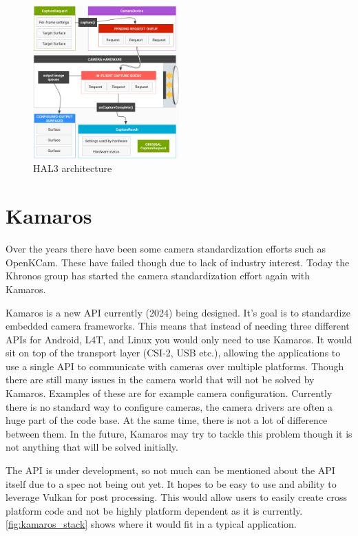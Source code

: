 \begin{figure}
    \begin{center}
        \includegraphics[width=0.5\textwidth]{figures/hal3arch}
    \end{center}
    \caption{HAL3 architecture \cite{hal3arch}}\label{fig:hal3arch}
\end{figure}

\section{Kamaros}
Over the years there have been some camera standardization efforts such as
OpenKCam. These have failed though due to lack of industry interest. Today
the Khronos group has started the camera standardization effort again with
Kamaros.

Kamaros is a new API currently (2024) being designed. It's goal is to
standardize embedded camera frameworks. This means that instead of needing
three different APIs for Android, L4T, and Linux you would only need to use
Kamaros. It would sit on top of the transport layer (CSI-2, USB etc.), allowing
the applications to use a single API to communicate with cameras over multiple
platforms. Though there are still many issues in the camera world that will not
be solved by Kamaros. Examples of these are for example camera configuration.
Currently there is no standard way to configure cameras, the camera drivers are
often a huge part of the code base. At the same time, there is not a lot of
difference between them. In the future, Kamaros may try to tackle this problem
though it is not anything that will be solved initially.

The API is under development, so not much can be mentioned about the API itself
due to a spec not being out yet. It hopes to be easy to use and ability to
leverage Vulkan for post processing. This would allow users to easily create
cross platform code and not be highly platform dependent as it is currently.
\cref{fig:kamaros_stack} shows where it would fit in a typical application.

